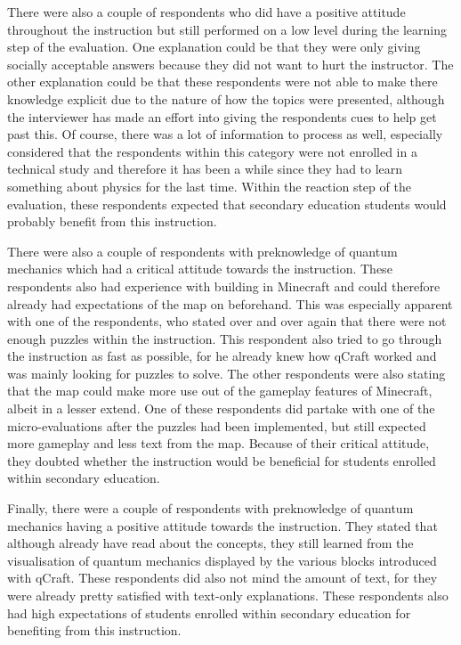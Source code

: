 \documentclass[11pt,twoside]{report} %
\begin{document}
There were also a couple of respondents who did have a positive attitude throughout the instruction but still performed on a low level during the learning step of the evaluation. One explanation could be that they were only giving socially acceptable answers because they did not want to hurt the instructor. The other explanation could be that these respondents were not able to make there knowledge explicit due to the nature of how the topics were presented, although the interviewer has made an effort into giving the respondents cues to help get past this. Of course, there was a lot of information to process as well, especially considered that the respondents within this category were not enrolled in a technical study and therefore it has been a while since they had to learn something about physics for the last time. Within the reaction step of the evaluation, these respondents expected that secondary education students would probably benefit from this instruction.

There were also a couple of respondents with preknowledge of quantum mechanics which had a critical attitude towards the instruction. These respondents also had experience with building in Minecraft and could therefore already had expectations of the map on beforehand. This was especially apparent with one of the respondents, who stated over and over again that there were not enough puzzles within the instruction. This respondent also tried to go through the instruction as fast as possible, for he already knew how qCraft worked and was mainly looking for puzzles to solve. The other respondents were also stating that the map could make more use out of the gameplay features of Minecraft, albeit in a lesser extend. One of these respondents did partake with one of the micro-evaluations after the puzzles had been implemented, but still expected more gameplay and less text from the map. Because of their critical attitude, they doubted whether the instruction would be beneficial for students enrolled within secondary education.

Finally, there were a couple of respondents with preknowledge of quantum mechanics having a positive attitude towards the instruction. They stated that although already have read about the concepts, they still learned from the visualisation of quantum mechanics displayed by the various blocks introduced with qCraft. These respondents did also not mind the amount of text, for they were already pretty satisfied with text-only explanations. These respondents also had high expectations of students enrolled within secondary education for benefiting from this instruction.
\end{document}
